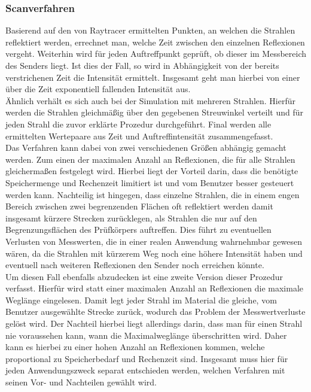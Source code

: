 \documentclass[reducespace,stylepage,semiarbeit]{spezidoc}
\begin{document}
\subsubsection{Scanverfahren} %
Basierend auf den von Raytracer ermittelten Punkten, an welchen die Strahlen reflektiert werden, errechnet man, welche Zeit zwischen den einzelnen Reflexionen vergeht.
Weiterhin wird für jeden Auftreffpunkt geprüft, ob dieser im Messbereich des Senders liegt. 
Ist dies der Fall, so wird in Abhängigkeit von der bereits verstrichenen Zeit die Intensität ermittelt. 
Insgesamt geht man hierbei von einer über die Zeit exponentiell fallenden Intensität aus.\\
Ähnlich verhält es sich auch bei der Simulation mit mehreren Strahlen. 
Hierfür werden die Strahlen gleichmäßig über den gegebenen Streuwinkel verteilt und für jeden Strahl die zuvor erklärte Prozedur durchgeführt. 
Final werden alle ermittelten Wertepaare aus Zeit und Auftreffintensität zusammengefasst.\\
Das Verfahren kann dabei von zwei verschiedenen Größen abhängig gemacht werden. 
Zum einen der maximalen Anzahl an Reflexionen, die für alle Strahlen gleichermaßen festgelegt wird. Hierbei liegt der Vorteil darin, dass die benötigte Speichermenge und Rechenzeit limitiert ist und vom Benutzer besser gesteuert werden kann. 
Nachteilig ist hingegen, dass einzelne Strahlen, die in einem engen Bereich zwischen zwei begrenzenden Flächen oft reflektiert werden damit insgesamt kürzere Strecken zurücklegen, als Strahlen die nur auf den Begrenzungsflächen des Prüfkörpers auftreffen. 
Dies führt zu eventuellen Verlusten von Messwerten, die in einer realen Anwendung wahrnehmbar gewesen wären, da die Strahlen mit kürzerem Weg noch eine höhere Intensität haben und eventuell nach weiteren Reflexionen den Sender noch erreichen könnte.\\
Um diesen Fall ebenfalls abzudecken ist eine zweite Version dieser Prozedur verfasst. 
Hierfür wird statt einer maximalen Anzahl an Reflexionen die maximale Weglänge eingelesen. 
Damit legt jeder Strahl im Material die gleiche, vom Benutzer ausgewählte Strecke zurück, wodurch das Problem der Messwertverluste gelöst wird. 
Der Nachteil hierbei liegt allerdings darin, dass man für einen Strahl nie voraussehen kann, wann die Maximalweglänge überschritten wird. 
Daher kann es hierbei zu einer hohen Anzahl an Reflexionen kommen, welche proportional zu Speicherbedarf und Rechenzeit sind. 
Insgesamt muss hier für jeden Anwendungszweck separat entschieden werden, welchen Verfahren mit seinen Vor- und Nachteilen gewählt wird.\\
\end{document}
